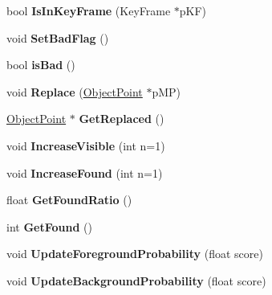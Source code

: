 \begin{DoxyCompactItemize}
\item 
\mbox{\label{classObjectPoint_a2f2689ae271ff5507808625c575da632}} 
bool {\bfseries Is\+In\+Key\+Frame} (Key\+Frame $\ast$p\+KF)
\item 
\mbox{\label{classObjectPoint_ac0cb808adfcc0b0cdc73c8babdd35af6}} 
void {\bfseries Set\+Bad\+Flag} ()
\item 
\mbox{\label{classObjectPoint_ac8c00f10d0f9523b28508a84a99823e3}} 
bool {\bfseries is\+Bad} ()
\item 
\mbox{\label{classObjectPoint_a3e3ace32e8166de6064808df9594ca15}} 
void {\bfseries Replace} (\hyperlink{classObjectPoint}{Object\+Point} $\ast$p\+MP)
\item 
\mbox{\label{classObjectPoint_ab6c95f0b65d8be939439629cb47a8ec7}} 
\hyperlink{classObjectPoint}{Object\+Point} $\ast$ {\bfseries Get\+Replaced} ()
\item 
\mbox{\label{classObjectPoint_acc115dfc5ed21459a75babb2a2e75155}} 
void {\bfseries Increase\+Visible} (int n=1)
\item 
\mbox{\label{classObjectPoint_a08bdc20dc077b215fe81766d65ae2e38}} 
void {\bfseries Increase\+Found} (int n=1)
\item 
\mbox{\label{classObjectPoint_a3d2a7145f524877ce771c4bed89673f5}} 
float {\bfseries Get\+Found\+Ratio} ()
\item 
\mbox{\label{classObjectPoint_a3d9c31d729335ff50424378f942bce2e}} 
int {\bfseries Get\+Found} ()
\item 
\mbox{\label{classObjectPoint_aabc6f5e6fcf13ca0182b448f264695e7}} 
void {\bfseries Update\+Foreground\+Probability} (float score)
\item 
\mbox{\label{classObjectPoint_a90bd8a4f458624d4c775c8828c2cc70f}} 
void {\bfseries Update\+Background\+Probability} (float score)
\item 
\mbox{\label{classObjectPoint_a31d5846d3f9b5c21b0196437aa62e1cc}} 

\end{DoxyCompactItemize}
